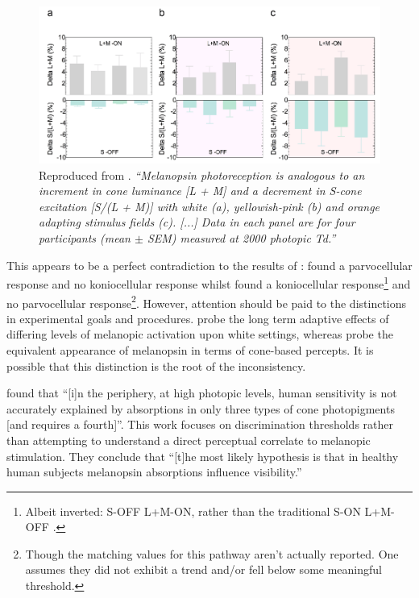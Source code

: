 \begin{figure}[htbp]
\includegraphics[max width=\textwidth, center]{figs/LitRev/zele.png}
\caption{Reproduced from \citet{zele_melanopsin_2018}. \textit{``Melanopsin photoreception is analogous to an increment in cone luminance [L + M] and a decrement in S-cone excitation [S/(L + M)] with white (a), yellowish-pink (b) and orange adapting stimulus fields (c). [...] Data in each panel are for four participants (mean $\pm$ SEM) measured at 2000 photopic Td.''}}
\label{fig:zele}
\end{figure}

This appears to be a perfect contradiction to the results of \citet{cao_evidence_2018}: \citet{cao_evidence_2018} found a parvocellular response and no koniocellular response whilst \citet{zele_melanopsin_2018} found a koniocellular response\footnote{Albeit inverted: S-OFF L+M-ON, rather than the traditional S-ON L+M-OFF \citep{hendry_koniocellular_2000}.} and no parvocellular response\footnote{Though the matching values for this pathway aren't actually reported. One assumes they did not exhibit a trend and/or fell below some meaningful threshold.}. However, attention should be paid to the distinctions in experimental goals and procedures. \citet{cao_evidence_2018} probe the long term adaptive effects of differing levels of melanopic activation upon white settings, whereas \citet{zele_melanopsin_2019} probe the equivalent appearance of melanopsin in terms of cone-based percepts. It is possible that this distinction is the root of the inconsistency.

\textbf{\citet{horiguchi_human_2013}} found that ``[i]n the periphery, at high photopic levels, human sensitivity is not accurately explained by absorptions in only three types of cone photopigments [and requires a fourth]''. This work focuses on discrimination thresholds rather than attempting to understand a direct perceptual correlate to melanopic stimulation. They conclude that ``[t]he most likely hypothesis is that in healthy human subjects melanopsin absorptions influence visibility.''

